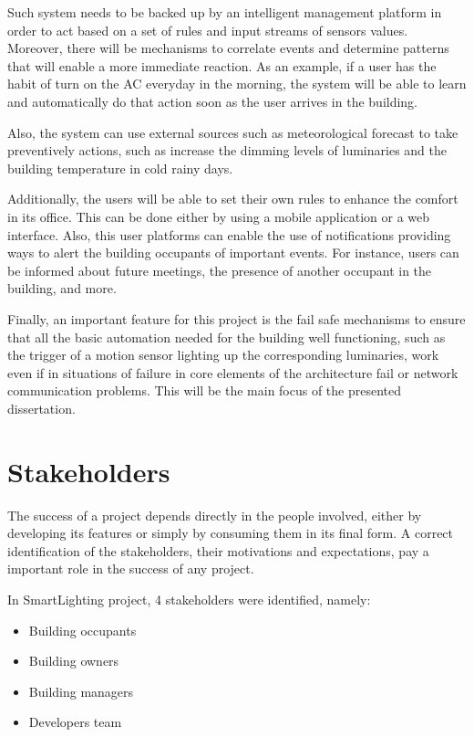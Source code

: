 Such system needs to be backed up by an intelligent management platform in order to act based on a set of rules and input streams of sensors values. Moreover, there will be mechanisms to correlate events and determine patterns that will enable a more immediate reaction. As an example, if a user has the habit of turn on the AC everyday in the morning, the system will be able to learn and automatically do that action soon as the user arrives in the building. 

Also, the system can use external sources such as meteorological forecast to take preventively actions, such as increase the dimming levels of luminaries and the building temperature in cold rainy days.

Additionally, the users will be able to set their own rules to enhance the comfort in its office. This can be done either by using a mobile application or a web interface. Also, this user platforms can enable the use of notifications providing ways to alert the building occupants of important events. For instance, users can be informed about future meetings, the presence of another occupant in the building, and more.

Finally, an important feature for this project is the fail safe mechanisms to ensure that all the basic automation needed for the building well functioning, such as the trigger of a motion sensor lighting up the corresponding luminaries, work even if in situations of failure in core elements of the architecture fail or network communication problems. This will be the main focus of the presented dissertation.

\newpage

\section{Stakeholders}
\label{Architecture:Stakeholders}

The success of a project depends directly in the people involved, either by developing its features or simply by consuming them in its final form. A correct identification of the stakeholders, their motivations and expectations, pay a important role in the success of any project. 

In SmartLighting project, 4 stakeholders were identified, namely:

\begin{itemize}
	\item Building occupants
	\item Building owners
	\item Building managers
	\item Developers team
\end{itemize}


